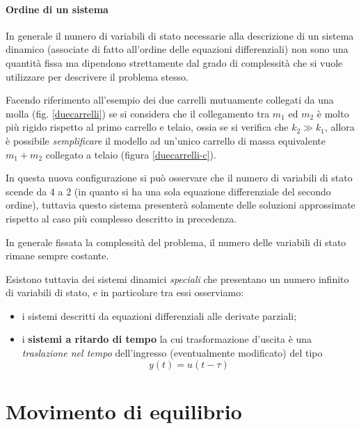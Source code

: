		\paragraph{Ordine di un sistema} In generale il numero di variabili di stato necessarie alla descrizione di un sistema dinamico (associate di fatto all'ordine delle equazioni differenziali) non sono una quantità fissa ma dipendono strettamente dal grado di complessità che si vuole utilizzare per descrivere il problema stesso.
		
		Facendo riferimento all'esempio dei due carrelli mutuamente collegati da una molla (fig. \ref{duecarrelli}) se si considera che il collegamento tra $m_1$ ed $m_2$ è molto più rigido rispetto al primo carrello e telaio, ossia se si verifica che $k_2\gg k_1$, allora è possibile \textit{semplificare} il modello ad un'unico carrello di massa equivalente $m_1+m_2$ collegato a telaio (figura \ref{duecarrelli-c}).
		
		
		In questa nuova configurazione si può osservare che il numero di variabili di stato scende da 4 a 2 (in quanto si ha una sola equazione differenziale del secondo ordine), tuttavia questo sistema presenterà solamente delle soluzioni approssimate rispetto al caso più complesso descritto in precedenza.
		
		\begin{concetto}
			In generale fissata la complessità del problema, il numero delle variabili di stato rimane sempre costante.
		\end{concetto}
	
		Esistono tuttavia dei sistemi dinamici \textit{speciali} che presentano un numero infinito di variabili di stato, e in particolare tra essi osserviamo:
		\begin{itemize}
			\item i sistemi descritti da equazioni differenziali alle derivate parziali;
			\item i \textbf{sistemi a ritardo di tempo} la cui trasformazione d'uscita è una \textit{traslazione nel tempo} dell'ingresso (eventualmente modificato) del tipo
			\[  y(t) = u(t-\tau) \]
		\end{itemize}
		
		
\section{Movimento di equilibrio}
	
